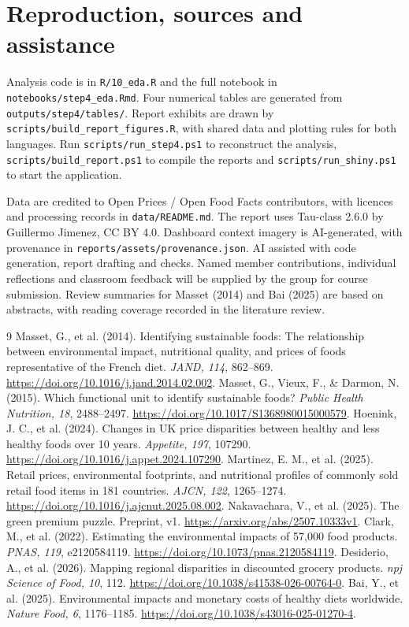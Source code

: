 \documentclass[11pt,a4paper,onecolumn,oneside]{tau-class/tau}
\begin{document}
\appendix
\section{Reproduction, sources and assistance}
Analysis code is in \nolinkurl{R/10_eda.R} and the full notebook in \nolinkurl{notebooks/step4_eda.Rmd}. Four numerical tables are generated from \nolinkurl{outputs/step4/tables/}. Report exhibits are drawn by \nolinkurl{scripts/build_report_figures.R}, with shared data and plotting rules for both languages. Run \nolinkurl{scripts/run_step4.ps1} to reconstruct the analysis, \nolinkurl{scripts/build_report.ps1} to compile the reports and \nolinkurl{scripts/run_shiny.ps1} to start the application.

Data are credited to Open Prices / Open Food Facts contributors, with licences and processing records in \nolinkurl{data/README.md}. The report uses Tau-class 2.6.0 by Guillermo Jimenez, CC BY 4.0. Dashboard context imagery is AI-generated, with provenance in \nolinkurl{reports/assets/provenance.json}. AI assisted with code generation, report drafting and checks. Named member contributions, individual reflections and classroom feedback will be supplied by the group for course submission. Review summaries for Masset (2014) and Bai (2025) are based on abstracts, with reading coverage recorded in the literature review.
\begin{thebibliography}{9}\small
{} Masset, G., et al. (2014). Identifying sustainable foods: The relationship between environmental impact, nutritional quality, and prices of foods representative of the French diet. \textit{JAND, 114}, 862--869. \url{https://doi.org/10.1016/j.jand.2014.02.002}.
 Masset, G., Vieux, F., \& Darmon, N. (2015). Which functional unit to identify sustainable foods? \textit{Public Health Nutrition, 18}, 2488--2497. \url{https://doi.org/10.1017/S1368980015000579}.
 Hoenink, J. C., et al. (2024). Changes in UK price disparities between healthy and less healthy foods over 10 years. \textit{Appetite, 197}, 107290. \url{https://doi.org/10.1016/j.appet.2024.107290}.
 Martinez, E. M., et al. (2025). Retail prices, environmental footprints, and nutritional profiles of commonly sold retail food items in 181 countries. \textit{AJCN, 122}, 1265--1274. \url{https://doi.org/10.1016/j.ajcnut.2025.08.002}.
 Nakavachara, V., et al. (2025). The green premium puzzle. Preprint, v1. \url{https://arxiv.org/abs/2507.10333v1}.
 Clark, M., et al. (2022). Estimating the environmental impacts of 57,000 food products. \textit{PNAS, 119}, e2120584119. \url{https://doi.org/10.1073/pnas.2120584119}.
 Desiderio, A., et al. (2026). Mapping regional disparities in discounted grocery products. \textit{npj Science of Food, 10}, 112. \url{https://doi.org/10.1038/s41538-026-00764-0}.
 Bai, Y., et al. (2025). Environmental impacts and monetary costs of healthy diets worldwide. \textit{Nature Food, 6}, 1176--1185. \url{https://doi.org/10.1038/s43016-025-01270-4}.
\end{thebibliography}
\end{document}
